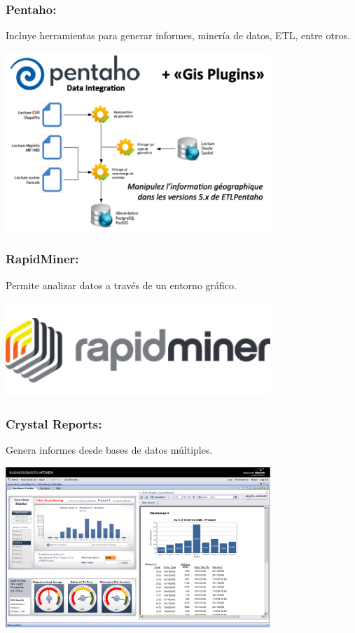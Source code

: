 \subsubsection{Pentaho: }\label{sec:nada2}  
Incluye herramientas para generar informes, minería de datos, ETL, entre otros.
	\begin{center}
	\includegraphics[width=10cm]{./Imagenes/BIimagen15}
	\end{center}
	
\subsubsection{RapidMiner: }\label{sec:nada2}  
Permite analizar datos a través de un entorno gráfico.
	\begin{center}
	\includegraphics[width=10cm]{./Imagenes/BIimagen16}
	\end{center}


\subsubsection{Crystal Reports: }\label{sec:nada2}  
Genera informes desde bases de datos múltiples.
	\begin{center}
	\includegraphics[width=10cm]{./Imagenes/BIimagen17}
	\end{center}
\newpage	
